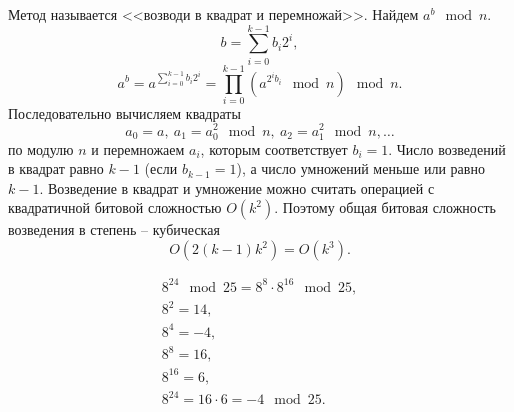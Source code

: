 Метод называется <<возводи в квадрат и перемножай>>. Найдем $a^b \mod n$.
    \[ b = \sum_{i=0}^{k-1} b_i 2^i, \]
    \[ a^b = a^{\sum\limits_{i=0}^{k-1} b_i 2^i} = \prod_{i=0}^{k-1} (a^{{2^i} b_i} \mod n) \mod n. \]
Последовательно вычисляем квадраты
    \[ a_0 = a, ~ a_1 = a_0^2 \mod n, ~ a_2 = a_1^2 \mod n,  \ldots  \]
по модулю $n$ и перемножаем $a_i$, которым соответствует $b_i = 1$.  Число возведений в квадрат равно $k-1$ (если $b_{k-1} =1$), а число умножений меньше или равно $k-1$. Возведение в квадрат и умножение можно считать операцией с квадратичной битовой сложностью $O(k^2)$. Поэтому общая битовая сложность возведения в степень -- кубическая
    \[ O(2(k-1)k^2) = O(k^3). \]

\example
\[ \begin{array}{l}
    8^{24} \mod 25 = 8^8 \cdot 8^{16} \mod 25, \\
    8^2 = 14, \\
    8^4 = -4, \\
    8^8 = 16, \\
    8^{16} = 6, \\
    8^{24} = 16 \cdot 6 = -4 \mod 25.
\end{array} \]
\exampleend
